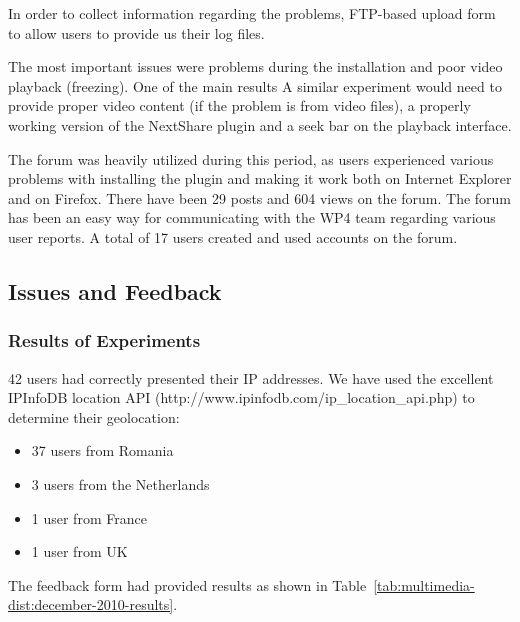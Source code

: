 In order to collect information regarding the problems, FTP-based upload form
to allow users to provide us their log files.

The most important issues were problems during the installation and poor video
playback (freezing). One of the main results A similar experiment would need
to provide proper video content (if the problem is from video files), a
properly working version of the NextShare plugin and a seek bar on the
playback interface.

The forum was heavily utilized during this period, as users experienced
various problems with installing the plugin and making it work both on
Internet Explorer and on Firefox. There have been 29 posts and 604 views on
the forum. The forum has been an easy way for communicating with the WP4 team
regarding various user reports. A total of 17 users created and used accounts
on the forum.

\subsection{Issues and Feedback}
\label{subsec:multimedia-dist:evaluation-issues}

\subsubsection{Results of Experiments}

42 users had correctly presented their IP addresses. We have used the
excellent IPInfoDB location API (http://www.ipinfodb.com/ip_location_api.php)
to determine their geolocation:
\begin{itemize}
  \item 37 users from Romania
  \item 3 users from the Netherlands
  \item 1 user from France
  \item 1 user from UK
\end{itemize}

The feedback form had provided results as shown in
Table~\ref{tab:multimedia-dist:december-2010-results}.

